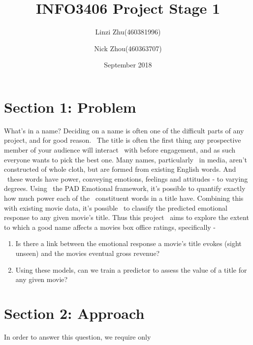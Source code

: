 \documentclass[10pt,a4paper]{article}
\begin{document}
\begin{titlepage}
    \title{INFO3406 Project Stage 1}
    \author{Linzi Zhu(460381996)\\
            \and
            Nick Zhou(460363707)
    }
    \date{September 2018}
    \maketitle
\end{titlepage}
    \begin{tableofcontents}
        \centering
        \tableofcontents
    \end{tableofcontents}
    \pagebreak

    \section{Section 1: Problem}
    What's in a name? Deciding on a name is often one of the difficult parts of any project, and for good reason. \
    The title is often the first thing any prospective member of your audience will interact \
    with before engagement, and as such everyone wants to pick the best one. Many names, particularly \
    in media, aren't constructed of whole cloth, but are formed from existing English words. And \
    these words have power, conveying emotions, feelings and attitudes - to varying degrees. Using \
    the PAD Emotional framework, it's possible to quantify exactly how much power each of the \
    constituent words in a title have. Combining this with existing movie data, it's possible \
    to classify the predicted emotional response to any given movie's title. Thus this project \
    aims to explore the extent to which a good name affects a movies box office ratings, specifically -

    \begin{enumerate}
        \item Is there a link between the emotional response a movie's title evokes (sight unseen) and the movies eventual gross revenue?
        \item Using these models, can we train a predictor to assess the value of a title for any given movie?

    \end{enumerate}

    \section{Section 2: Approach}
    In order to answer this question, we require only
    
\end{document}
